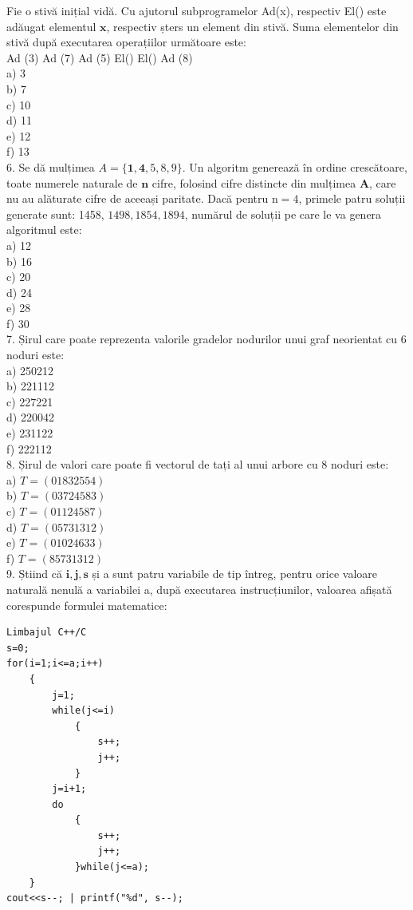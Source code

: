 \documentclass[10pt]{article}
\begin{document}
Fie o stivă inițial vidă. Cu ajutorul subprogramelor Ad(x), respectiv El() este adăugat elementul $\mathbf{x}$, respectiv șters un element din stivă. Suma elementelor din stivă după executarea operațiilor următoare este:\\
Ad (3) Ad (7) Ad (5) El() El() Ad (8)\\
a) 3\\
b) 7\\
c) 10\\
d) 11\\
e) 12\\
f) 13\\
6. Se dă mulțimea $A=\{\mathbf{1}, \mathbf{4}, 5,8,9\}$. Un algoritm generează în ordine crescătoare, toate numerele naturale de $\mathbf{n}$ cifre, folosind cifre distincte din mulțimea $\mathbf{A}$, care nu au alăturate cifre de aceeași paritate. Dacă pentru $\mathrm{n}=4$, primele patru soluții generate sunt: 1458, $1498,1854,1894$, numărul de soluții pe care le va genera algoritmul este:\\
a) 12\\
b) 16\\
c) 20\\
d) 24\\
e) 28\\
f) 30\\
7. Șirul care poate reprezenta valorile gradelor nodurilor unui graf neorientat cu 6 noduri este:\\
a) 250212\\
b) 221112\\
c) 227221\\
d) 220042\\
e) 231122\\
f) 222112\\
8. Șirul de valori care poate fi vectorul de tați al unui arbore cu 8 noduri este:\\
a) $T=(01832554)$\\
b) $T=(03724583)$\\
c) $T=(01124587)$\\
d) $T=(05731312)$\\
e) $T=(01024633)$\\
f) $T=(85731312)$\\
9. Știind că $\mathbf{i}, \mathbf{j}, \mathbf{s}$ și a sunt patru variabile de tip întreg, pentru orice valoare naturală nenulă a variabilei a, după executarea instrucțiunilor, valoarea afișată corespunde formulei matematice:

\begin{verbatim}
Limbajul C++/C
s=0;
for(i=1;i<=a;i++)
    {
        j=1;
        while(j<=i)
            {
                s++;
                j++;
            }
        j=i+1;
        do
            {
                s++;
                j++;
            }while(j<=a);
    }
cout<<s--; | printf("%d", s--);
\end{verbatim}
\end{document}
